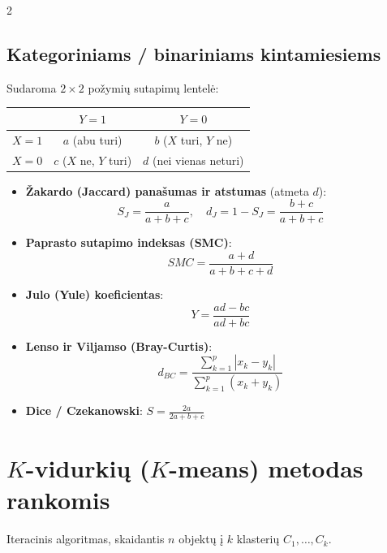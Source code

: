 \documentclass[9pt,a4paper]{article}
\begin{document}
\begin{multicols*}{2}
\subsection{Kategoriniams / binariniams kintamiesiems}
Sudaroma $2 \times 2$ požymių sutapimų lentelė:
\begin{center}
\begin{tabular}{|c|c|c|}
\hline
 & $Y = 1$ & $Y = 0$ \\
\hline
$X = 1$ & $a$ (abu turi) & $b$ ($X$ turi, $Y$ ne) \\
\hline
$X = 0$ & $c$ ($X$ ne, $Y$ turi) & $d$ (nei vienas neturi) \\
\hline
\end{tabular}
\end{center}
\begin{itemize}
    \item \textbf{Žakardo (Jaccard) panašumas ir atstumas} (atmeta $d$):
    \begin{equation*}
        S_J = \frac{a}{a + b + c}, \quad d_J = 1 - S_J = \frac{b + c}{a + b + c}
    \end{equation*}
    \item \textbf{Paprasto sutapimo indeksas (SMC)}:
    \begin{equation*}
        SMC = \frac{a + d}{a + b + c + d}
    \end{equation*}
    \item \textbf{Julo (Yule) koeficientas}:
    \begin{equation*}
        Y = \frac{ad - bc}{ad + bc}
    \end{equation*}
    \item \textbf{Lenso ir Viljamso (Bray-Curtis)}:
    \begin{equation*}
        d_{BC} = \frac{\sum_{k=1}^p |x_k - y_k|}{\sum_{k=1}^p (x_k + y_k)}
    \end{equation*}
    \item \textbf{Dice / Czekanowski}: $S = \frac{2a}{2a + b + c}$
\end{itemize}

\section{$K$-vidurkių ($K$-means) metodas rankomis}
Iteracinis algoritmas, skaidantis $n$ objektų į $k$ klasterių $C_1, \dots, C_k$.


\end{multicols*}
\end{document}
